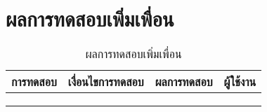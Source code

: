 \section{ผลการทดสอบเพิ่มเพื่อน}
\begin{table}[H]
	\caption{ผลการทดสอบเพิ่มเพื่อน}
    \centering	
	\label{tab:test24}
    \begin{tabular}{ | p{4cm} | p{4cm} | p{4cm} | p{2cm} | }
		\hline
	\multicolumn{1}{|c|}{การทดสอบ} & \multicolumn{1}{c|}{เงื่อนไขการทดสอบ} & \multicolumn{1}{c|}{ผลการทดสอบ} & \multicolumn{1}{c|}{ผู้ใช้งาน}                             \\ \hline
	\setstretch{1.0}{ทดสอบเพิ่มเพื่อน}
	& \setstretch{1.0}{ผู้ใช้เป็นเพื่อนกับผู้ใช้แล้ว และกดเพิ่มเพื่อน}
	& \setstretch{1.0}{ระบบแสดงข้อความ “คุณได้เป็นเพื่อนกันแล้ว”} 
	&\setstretch{1.0}{\begin{flushleft}ผู้ใช้งาน\end{flushleft}} \\ \cline{2-3} 
	& \setstretch{1.0}{ผู้ใช้ส่งคำร้องขอให้กับผู้ใช้แล้ว และกดเพิ่มเพื่อน}
	& \setstretch{1.0}{ระบบแสดงข้อความ “คุณได้ส่งคำร้องขอเป็นเพื่อนแล้ว” } 
	&\setstretch{1.0}{}\\ \cline{2-3} 
	& \setstretch{1.0}{ผู้ใช้ไม่เคยส่งคำร้องขอกับผู้ใช้ และกดเพิ่มเพื่อน}
	& \setstretch{1.0}{ระบบแสดงข้อความ “คุณได้ส่งคำร้องขอไปที่ ชื่อผู้ใช้ เรียบร้อยแล้ว” } 
	&\setstretch{1.0}{}\\ \cline{2-3} 
    \end{tabular}
\end{table}

